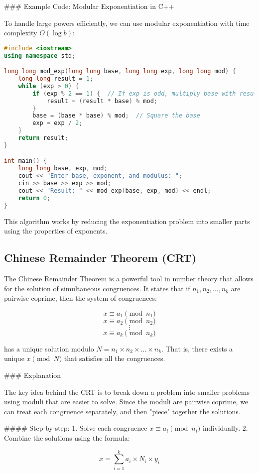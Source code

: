 \documentclass[10pt,a4paper]{article}
\begin{document}
### Example Code: Modular Exponentiation in C++

To handle large powers efficiently, we can use modular exponentiation with time complexity \(O(\log b)\):

\begin{lstlisting}[language=C++]
#include <iostream>
using namespace std;

long long mod_exp(long long base, long long exp, long long mod) {
    long long result = 1;
    while (exp > 0) {
        if (exp % 2 == 1) {  // If exp is odd, multiply base with result
            result = (result * base) % mod;
        }
        base = (base * base) % mod;  // Square the base
        exp = exp / 2;
    }
    return result;
}

int main() {
    long long base, exp, mod;
    cout << "Enter base, exponent, and modulus: ";
    cin >> base >> exp >> mod;
    cout << "Result: " << mod_exp(base, exp, mod) << endl;
    return 0;
}
\end{lstlisting}

This algorithm works by reducing the exponentiation problem into smaller parts using the properties of exponents.


\subsection*{Chinese Remainder Theorem (CRT)}

The Chinese Remainder Theorem is a powerful tool in number theory that allows for the solution of simultaneous congruences. It states that if \(n_1, n_2, \dots, n_k\) are pairwise coprime, then the system of congruences:

\[
x \equiv a_1 \pmod{n_1}
\]
\[
x \equiv a_2 \pmod{n_2}
\]
\[
\vdots
\]
\[
x \equiv a_k \pmod{n_k}
\]

has a unique solution modulo \(N = n_1 \times n_2 \times \dots \times n_k\). That is, there exists a unique \(x \pmod{N}\) that satisfies all the congruences.

### Explanation

The key idea behind the CRT is to break down a problem into smaller problems using moduli that are easier to solve. Since the moduli are pairwise coprime, we can treat each congruence separately, and then "piece" together the solutions.

#### Step-by-step:
1. Solve each congruence \(x \equiv a_i \pmod{n_i}\) individually.
2. Combine the solutions using the formula:

\[
x = \sum_{i=1}^{k} a_i \times N_i \times y_i
\]
\end{document}
